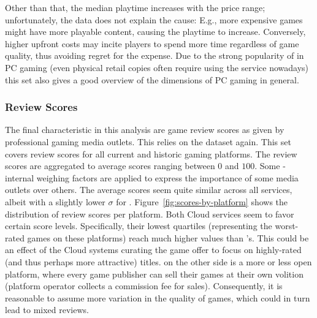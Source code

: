Other than that, the median playtime increases with the price range;
unfortunately, the data does not explain the cause: E.g., more expensive
games might have more playable content, causing the playtime to
increase. Conversely, higher upfront costs may incite players to spend
more time regardless of game quality, thus avoiding regret for the
expense.
Due to the strong popularity of \steam in \gls{PC} gaming (even physical
retail copies often require using the service nowadays) this set also
gives a good overview of the dimensions of \gls{PC} gaming in general.


\subsubsection{Review Scores}

The final characteristic in this analysis are game review scores as
given by professional gaming media outlets. This relies on the
\metacritic dataset again. This set covers review scores for all current
and historic gaming platforms. The review scores are aggregated to
average scores ranging between $0$ and $100$. Some \metacritic-internal
weighing factors are applied to express the importance of some media
outlets over others.
The average scores seem quite similar across all services, albeit with a
slightly lower $\sigma$ for \gfnow. Figure~\ref{fig:scores-by-platform}
shows the distribution of review scores per platform. Both Cloud
services seem to favor certain score levels. Specifically, their lowest
quartiles (representing the worst-rated games on these platforms) reach
much higher values than \steam's. This could be an effect of the Cloud
systems curating the game offer to focus on highly-rated (and thus
perhaps more attractive) titles. \steam on the other side is a more or
less open platform, where every game publisher can sell their games at
their own volition (platform operator collects a commission fee for
sales). Consequently, it is reasonable to assume more variation in the
quality of games, which could in turn lead to mixed reviews.

